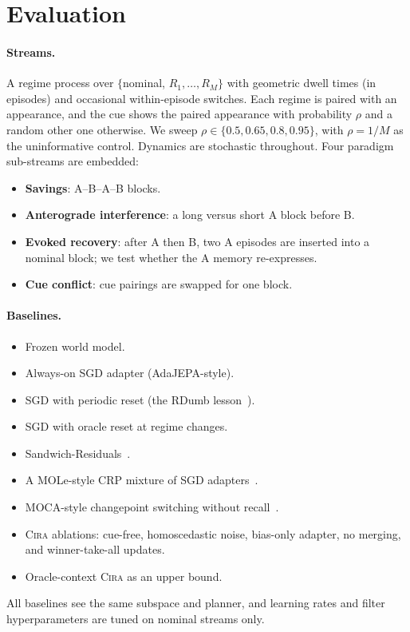 \documentclass[10pt]{article}
\newcommand{\method}{\textsc{Cira}}
\begin{document}
\section{Evaluation}

\paragraph{Streams.}
A regime process over $\{$nominal, $R_1,\dots,R_M\}$ with geometric dwell times (in episodes) and
occasional within-episode switches. Each regime is paired with an appearance, and the cue shows the
paired appearance with probability $\rho$ and a random other one otherwise. We sweep
$\rho\in\{0.5,0.65,0.8,0.95\}$, with $\rho=1/M$ as the uninformative control. Dynamics are stochastic
throughout. Four paradigm sub-streams are embedded:
\begin{itemize}
  \item \textbf{Savings}: A--B--A--B blocks.
  \item \textbf{Anterograde interference}: a long versus short A block before B.
  \item \textbf{Evoked recovery}: after A then B, two A episodes are inserted into a nominal block; we
  test whether the A memory re-expresses.
  \item \textbf{Cue conflict}: cue pairings are swapped for one block.
\end{itemize}

\paragraph{Baselines.}
\begin{itemize}
  \item Frozen world model.
  \item Always-on SGD adapter (AdaJEPA-style).
  \item SGD with periodic reset (the RDumb lesson~\cite{press2023rdumb}).
  \item SGD with oracle reset at regime changes.
  \item Sandwich-Residuals~\cite{soni2026sandwich}.
  \item A MOLe-style CRP mixture of SGD adapters~\cite{nagabandi2019mole}.
  \item MOCA-style changepoint switching without recall~\cite{harrison2020moca}.
  \item \method{} ablations: cue-free, homoscedastic noise, bias-only adapter, no merging, and
  winner-take-all updates.
  \item Oracle-context \method{} as an upper bound.
\end{itemize}
All baselines see the same subspace and planner, and learning rates and filter hyperparameters are tuned
on nominal streams only.
\end{document}

